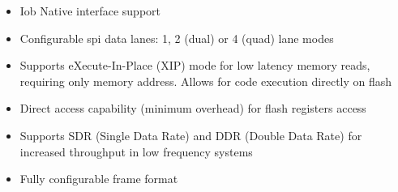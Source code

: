  \begin{itemize}
	\item Iob Native interface support
	\item Configurable spi data lanes: 1, 2 (dual) or 4 (quad) lane modes
	\item Supports eXecute-In-Place (XIP) mode for low latency
		memory reads, requiring only memory address. Allows for code execution
		directly on flash
	\item Direct access capability (minimum overhead) for flash registers
		access
	\item Supports SDR (Single Data Rate) and DDR (Double Data Rate) for increased
		throughput in low frequency systems
	\item Fully configurable frame format
 \end{itemize}
